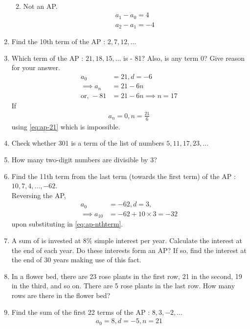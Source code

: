 \begin{enumerate}[label=\thesubsection.\arabic*, ref=\thesubsection.\theenumi]
\begin{enumerate}
\begin{align}
\end{align}
	\item 
		Not an AP.
\begin{align}
	 a_1-a_0=4
	\\
	 a_2-a_1=-4
\end{align}
\end{enumerate}
\item Find the 10th term of the AP : $2,  7,  12,  \dots$
\item Which term of the AP : $21,  18,  15,  \dots$ is - 81? Also,  is any term 0? Give reason for your answer.
	\\
	\solution
\begin{align}
	a_0 &= 21, d = -6
	\\
	\implies a_n &= 21 -6n
	\label{eq:ap-21}
	\\
	\text{or, }-81 &=21-6n \implies n = 17
\end{align}
If
\begin{align}
	a_n = 0, 
 n= \frac{21}{6}
\end{align}
	using \eqref{eq:ap-21} which is impossible.
\item Check whether 301 is a term of the list of numbers $5,  11,  17,  23,  \dots$
\item How many two-digit numbers are divisible by 3?
\item Find the 11th term from the last term (towards the first term) of the
AP : $10,  7,  4,  \dots,  - 62$.
	\\
	\solution Reversing the AP,
\begin{align}
	a_0 &= -62, d = 3, 
	\\
	\implies a_{10}&=-62+10\times 3 = -32
\end{align}
upon substituting in
	\eqref{eq:ap-nthterm}.
\item A sum of  is invested at $8\%$ simple interest per year. Calculate the interest at the end of each year. Do these interests form an AP? If so,  find the interest at the end of 30 years making use of this fact.
\item In a flower bed,  there are 23 rose plants in the first row,  21 in the
second,  19 in the third,  and so on. There are 5 rose plants in the last row. How many rows are there in the flower bed?
\item Find the sum of the first 22 terms of the AP : $8,  3,  -2,  \dots$
	\\
	\solution
\begin{align}
a_0 = 8, d = -5, n = 21
\\

\end{align}
\end{enumerate}
